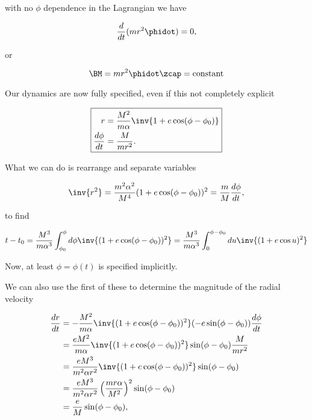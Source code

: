 with no $\phi$ dependence in the Lagrangian we have

\begin{equation}\label{eqn:RungeLenz:290}
\frac{d}{dt} (m r^2 \phidot) = 0,
\end{equation}

or

\begin{equation}\label{eqn:RungeLenz:310}
\BM = m r^2 \phidot \zcap = \text{constant}
\end{equation}

Our dynamics are now fully specified, even if this not completely explicit

\begin{equation}\label{eqn:RungeLenz:330}
\boxed{
\begin{aligned}
r &= \frac{M^2}{m \alpha} \inv{1 + e \cos(\phi - \phi_0)} \\
\frac{d\phi}{dt} &= \frac{M}{ m r^2}.
\end{aligned}
}
\end{equation}

What we can do is rearrange and separate variables

\begin{equation}\label{eqn:RungeLenz:350}
\inv{r^2} = \frac{m^2 \alpha^2}{M^4} (1 + e \cos(\phi - \phi_0))^2 = \frac{m}{M} \frac{d\phi}{dt},
\end{equation}

to find

\begin{equation}\label{eqn:RungeLenz:370}
t - t_0 
= 
\frac{M^3}{m \alpha^3} 
\int_{\phi_0}^\phi d\phi 
\inv{(1 + e \cos(\phi - \phi_0))^2}
=
\frac{M^3}{m \alpha^3} 
\int_0^{\phi - \phi_0} du
\inv{(1 + e \cos u)^2}
\end{equation}

Now, at least $\phi = \phi(t)$ is specified implicitly.

We can also use the first of these to determine the magnitude of the radial velocity

\begin{align*}
\frac{dr}{dt} 
&=
-\frac{M^2}{m \alpha} \inv{(1 + e \cos(\phi - \phi_0))^2} (-e \sin(\phi - \phi_0)) \frac{d\phi}{dt} \\
&=
\frac{e M^2}{m \alpha} \inv{(1 + e \cos(\phi - \phi_0))^2} \sin(\phi - \phi_0) \frac{M}{m r^2} \\
&=
\frac{e M^3}{m^2 \alpha r^2} \inv{(1 + e \cos(\phi - \phi_0))^2} \sin(\phi - \phi_0) \\
&=
\frac{e M^3}{m^2 \alpha r^2} \left( \frac{ m r \alpha }{M^2} \right)^2 \sin(\phi - \phi_0) \\
&=
\frac{e }{M } \sin(\phi - \phi_0),
\end{align*}

